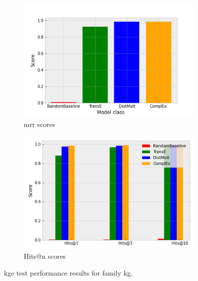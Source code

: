 \begin{figure}[htbp]
\centering
\begin{subfigure}{.5\textwidth}
  \centering
  \includegraphics[width=1\linewidth]{figures/model_selection/family_mrr.png}
  \caption{\gls{mrr} scores}
  \label{fig:model_selection_mrr_family}
\end{subfigure}%
\begin{subfigure}{.5\textwidth}
  \centering
  \includegraphics[width=1\linewidth]{figures/model_selection/family_hit_scores.png}
  \caption{Hits@n scores}
  \label{fig:model_selection_hit_scores_family}
\end{subfigure}
\caption[KGE test results for family KG.]{\gls{kge} test performance results for family \gls{kg}.}
\label{fig:model_selection_metrics_family}
\end{figure}


